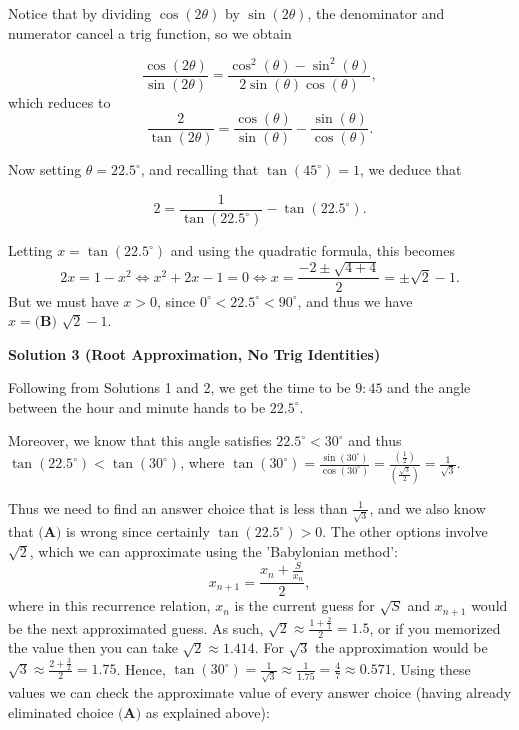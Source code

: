 \begin{enumerate}
 Notice that by dividing $\cos(2 \theta)$ by $\sin(2 \theta)$, the denominator and numerator cancel a trig function, so we obtain

 
 \[\frac{\cos(2 \theta)}{\sin(2 \theta)} = \frac{\cos^2(\theta)-\sin^2(\theta)}{2 \sin(\theta)\cos(\theta)},\] which reduces to
 \[\frac{2}{\tan(2 \theta)} = \frac{\cos(\theta)}{\sin(\theta)} - \frac{\sin(\theta)}{\cos(\theta)}.\]

 Now setting $\theta = 22.5^{\circ}$, and recalling that $\tan\left(45^{\circ}\right) = 1$, we deduce that

 
 \[2 = \frac{1}{\tan\left(22.5^{\circ}\right)} - \tan\left(22.5^{\circ}\right).\]

 Letting $x = \tan\left(22.5^{\circ}\right)$ and using the quadratic formula, this becomes
 \[2x = 1 - x^2 \iff x^2 + 2x - 1 = 0 \iff x = \frac{-2\pm\sqrt{4+4}}{2} = \pm\sqrt{2} - 1.\]But we must have $x > 0$, since $0^{\circ} < 22.5^{\circ} < 90^{\circ}$, and thus we have $x = \boxed{\textbf{(B) } \sqrt{2}-1}$.

 



\textbf{Solution 3 (Root Approximation, No Trig Identities)}

Following from Solutions 1 and 2, we get the time to be $9:45$ and the angle between the hour and minute hands to be $22.5^{\circ}$.

 Moreover, we know that this angle satisfies $22.5^{\circ} < 30^{\circ}$ and thus $\tan\left(22.5^{\circ}\right) < \tan\left(30^{\circ}\right)$, where $\tan\left(30^{\circ}\right) = \frac{\sin\left(30^{\circ}\right)}{\cos\left(30^{\circ}\right)} = \frac{\left(\frac{1}{2}\right)}{\left(\frac{\sqrt{3}}{2}\right)} = \frac{1}{\sqrt{3}}$.

 Thus we need to find an answer choice that is less than $\frac{1}{\sqrt{3}}$, and we also know that $\textbf{(A)}$ is wrong since certainly $\tan\left(22.5^{\circ}\right) > 0$. The other options involve $\sqrt{2}$, which we can approximate using the 'Babylonian method':
 \[x_{n+1} = \frac{x_n + \frac{S}{x_n}}{2},\]where in this recurrence relation, $x_{n}$ is the current guess for $\sqrt{S}$ and $x_{n+1}$ would be the next approximated guess. As such, $\sqrt{2} \approx \frac{1+\frac{2}{1}}{2} = 1.5$, or if you memorized the value then you can take $\sqrt{2} \approx 1.414$. For $\sqrt{3}$ the approximation would be $\sqrt{3} \approx \frac{2+\frac{3}{2}}{2} = 1.75$. Hence, $\tan\left(30^{\circ}\right) = \frac{1}{\sqrt{3}} \approx \frac{1}{1.75} = \frac{4}{7} \approx 0.571$. Using these values we can check the approximate value of every answer choice (having already eliminated choice $\textbf{(A)}$ as explained above):


\end{enumerate}
